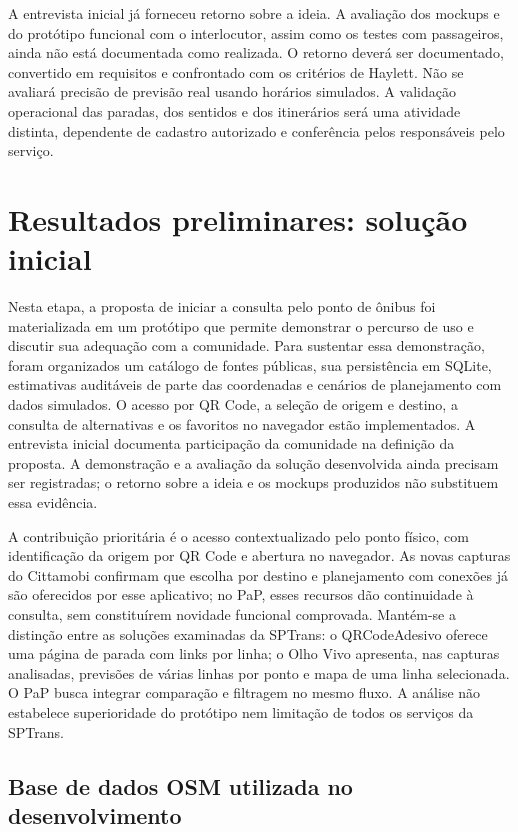 \documentclass[12pt,oneside,a4paper,brazil]{abntex2}
\begin{document}
A entrevista inicial já forneceu retorno sobre a ideia. A avaliação dos mockups e do protótipo funcional com o interlocutor, assim como os testes com passageiros, ainda não está documentada como realizada. O retorno deverá ser documentado, convertido em requisitos e confrontado com os critérios de Haylett. Não se avaliará precisão de previsão real usando horários simulados. A validação operacional das paradas, dos sentidos e dos itinerários será uma atividade distinta, dependente de cadastro autorizado e conferência pelos responsáveis pelo serviço.

\section{Resultados preliminares: solução inicial}

Nesta etapa, a proposta de iniciar a consulta pelo ponto de ônibus foi materializada em um protótipo que permite demonstrar o percurso de uso e discutir sua adequação com a comunidade. Para sustentar essa demonstração, foram organizados um catálogo de fontes públicas, sua persistência em SQLite, estimativas auditáveis de parte das coordenadas e cenários de planejamento com dados simulados. O acesso por QR Code, a seleção de origem e destino, a consulta de alternativas e os favoritos no navegador estão implementados. A entrevista inicial documenta participação da comunidade na definição da proposta. A demonstração e a avaliação da solução desenvolvida ainda precisam ser registradas; o retorno sobre a ideia e os mockups produzidos não substituem essa evidência.

A contribuição prioritária é o acesso contextualizado pelo ponto físico, com identificação da origem por QR Code e abertura no navegador. As novas capturas do Cittamobi confirmam que escolha por destino e planejamento com conexões já são oferecidos por esse aplicativo; no PaP, esses recursos dão continuidade à consulta, sem constituírem novidade funcional comprovada. Mantém-se a distinção entre as soluções examinadas da SPTrans: o QRCodeAdesivo oferece uma página de parada com links por linha; o Olho Vivo apresenta, nas capturas analisadas, previsões de várias linhas por ponto e mapa de uma linha selecionada. O PaP busca integrar comparação e filtragem no mesmo fluxo. A análise não estabelece superioridade do protótipo nem limitação de todos os serviços da SPTrans.

\subsection{Base de dados OSM utilizada no desenvolvimento}
\end{document}
